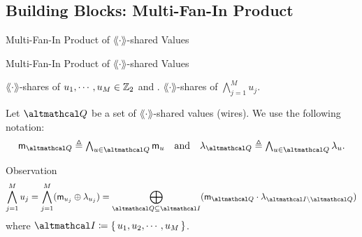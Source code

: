 \documentclass[../240906_cryptlab_flute.tex]{subfiles}
\begin{document}
\subsection{Building Blocks: Multi-Fan-In Product}
\begin{frame}{Multi-Fan-In Product of \(\lang\cdot\rang\)-shared Values}
    \begin{block}{Multi-Fan-In Product of \(\lang\cdot\rang\)-shared Values}
        \begin{description}[Output]
            \ii[Input]
            \(\lang\cdot\rang\)-shares of \(u_1, \cdots, u_M \in \mathbb{Z}_2\) and .
            \ii[Output]
            \(\lang\cdot\rang\)-shares of \(\bigwedge_{j=1}^M u_j\).
        \end{description}
    \end{block}
    \pause
    \begin{exampleblock}{}
        Let \(\mcal{Q}\) be a set of
        \(\lang\cdot\rang\)-shared values (wires).
        We use the following notation:
        \[\textstyle
            \msf{m}_{\mcal{Q}} \triangleq \bigwedge_{u \in \mcal{Q}} \msf{m}_u
            \quad\text{and}\quad
            \lambda_{\mcal{Q}} \triangleq \bigwedge_{u \in \mcal{Q}} \lambda_u.
        \]
    \end{exampleblock}
    \pause
    \begin{exampleblock}{Observation}
        \[
            \bigwedge_{j=1}^M u_j = \bigwedge_{j=1}^M (\msf{m}_{u_j} \oplus \lambda_{u_j})
            = \bigoplus_{\mcal{Q} \subseteq \mcal{I}}
                (\msf{m}_{\mcal{Q}} \cdot \lambda_{\mcal{I} \setminus \mcal{Q}})
        \]
        where \(\mcal{I} \coloneqq \{\,u_1,u_2,\cdots,u_M\,\}\).
    \end{exampleblock}
\end{frame}
\end{document}
